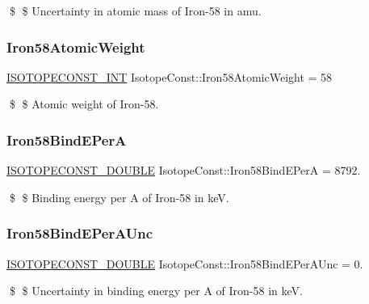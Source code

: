 \$ \$ Uncertainty in atomic mass of Iron-\/58 in amu. \mbox{\label{group___isotope_const-_iron-_fe58_gadf0b9dfde2c7e5bd69ea9552d6fef0d1}} 
\subsubsection{\texorpdfstring{Iron58\+Atomic\+Weight}{Iron58AtomicWeight}}
{\footnotesize\ttfamily \mbox{\hyperlink{group___isotope_const-_macros_ga5f18360b3e99483a35c32d789e62621c}{I\+S\+O\+T\+O\+P\+E\+C\+O\+N\+S\+T\+\_\+\+I\+NT}} Isotope\+Const\+::\+Iron58\+Atomic\+Weight = 58}

\$ \$ Atomic weight of Iron-\/58. \mbox{\label{group___isotope_const-_iron-_fe58_ga96b13660b249984062c6ba0589d6d47d}} 
\subsubsection{\texorpdfstring{Iron58\+Bind\+E\+PerA}{Iron58BindEPerA}}
{\footnotesize\ttfamily \mbox{\hyperlink{group___isotope_const-_macros_ga8f45a7272ce02c0b4c65c44636ed719a}{I\+S\+O\+T\+O\+P\+E\+C\+O\+N\+S\+T\+\_\+\+D\+O\+U\+B\+LE}} Isotope\+Const\+::\+Iron58\+Bind\+E\+PerA = 8792.}

\$ \$ Binding energy per A of Iron-\/58 in keV. \mbox{\label{group___isotope_const-_iron-_fe58_gadc5d114b881192006230256a69089047}} 
\subsubsection{\texorpdfstring{Iron58\+Bind\+E\+Per\+A\+Unc}{Iron58BindEPerAUnc}}
{\footnotesize\ttfamily \mbox{\hyperlink{group___isotope_const-_macros_ga8f45a7272ce02c0b4c65c44636ed719a}{I\+S\+O\+T\+O\+P\+E\+C\+O\+N\+S\+T\+\_\+\+D\+O\+U\+B\+LE}} Isotope\+Const\+::\+Iron58\+Bind\+E\+Per\+A\+Unc = 0.}

\$ \$ Uncertainty in binding energy per A of Iron-\/58 in keV. \mbox{\label{group___isotope_const-_iron-_fe58_ga02d03247504ffcad00d11125222609a3}} 
